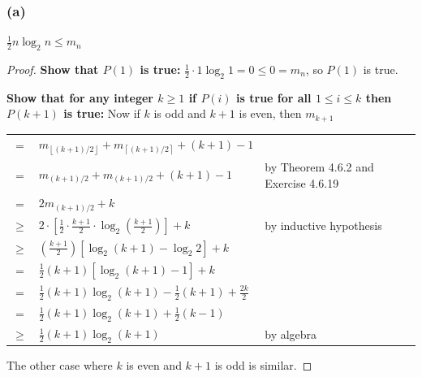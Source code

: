 \documentclass[14pt]{extarticle}
\newcommand{\dps}{\displaystyle}
\newcommand{\cy}{\color{cyan}}
\newcommand{\floor}[1]{{\left\lfloor#1\right\rfloor}}
\newcommand{\ceil}[1]{{\left\lceil#1\right\rceil}}
\begin{document}
\subsubsection{(a)}
\(\frac{1}{2} n \log_2 n \leq m_n\)
\begin{proof}
    {\bf Show that \(P(1)\) is true:} \(\frac{1}{2} \cdot 1 \log_2 1 = 0 \leq 0 = m_n\), so \(P(1)\) is true.

        {\bf Show that for any integer \(k \geq 1\) if \(P(i)\) is true for all \(1 \leq i \leq k\) then \(P(k+1)\) is true:}
    Now if \(k\) is odd and \(k+1\) is even, then \(m_{k+1}\)

    \begin{tabular}{cll}
        =        & \(m_{\floor{(k+1)/2}} + m_{\ceil{(k+1)/2}} + (k+1) - 1\)                                                 &                                            \\
        =        & \(m_{(k+1)/2} + m_{(k+1)/2} + (k+1) - 1\)                                                                & {\cy by Theorem 4.6.2 and Exercise 4.6.19} \\
        =        & \(2m_{(k+1)/2} + k\)                                                                                     &                                            \\
        \(\geq\) & \(\dps 2 \cdot \left[\frac{1}{2} \cdot \frac{k+1}{2} \cdot \log_2\left(\frac{k+1}{2}\right)\right] + k\) &
        {\cy by inductive hypothesis}                                                                                                                                    \\
        \(\geq\) & \(\dps \left(\frac{k+1}{2}\right)[\log_2(k+1) - \log_2 2] + k\)                                          &                                            \\
        =        & \(\frac{1}{2}(k+1)[\log_2(k+1) - 1] + k\)                                                                &                                            \\
        =        & \(\frac{1}{2}(k+1)\log_2(k+1) - \frac{1}{2}(k+1) + \frac{2k}{2}\)                                        &                                            \\
        =        & \(\frac{1}{2}(k+1)\log_2(k+1) + \frac{1}{2}(k-1)\)                                                       &                                            \\
        \(\geq\) & \(\frac{1}{2}(k+1)\log_2(k+1)\)                                                                          & {\cy by algebra}                           \\
    \end{tabular}

    The other case where \(k\) is even and \(k+1\) is odd is similar.
\end{proof}
\end{document}
